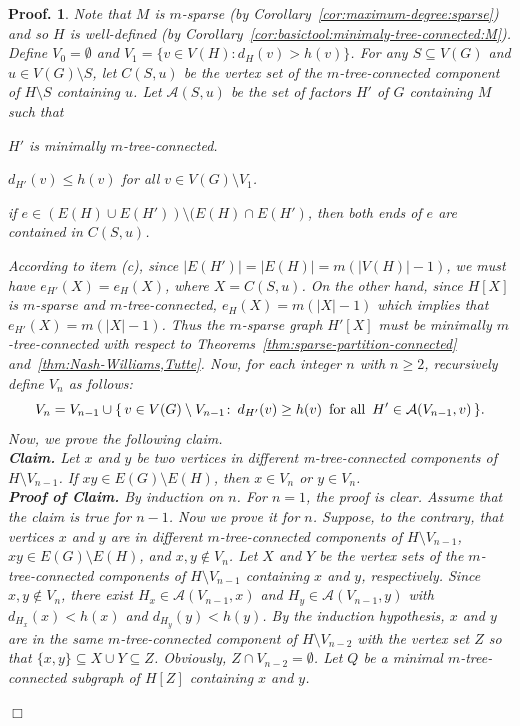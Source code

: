 \documentclass[10pt,bezier]{article}
\newtheorem{preproof}{{\bf Proof.}}
\newenvironment{proof}[1]{\begin{preproof}{\rm
#1}\hfill{$\Box$}}{\end{preproof}}
\begin{document}
\begin{proof}
{Note that $M$ is $m$-sparse (by Corollary~\ref{cor:maximum-degree:sparse}) and so $H$ is well-defined (by Corollary~\ref{cor:basictool:minimaly-tree-connected:M}).
Define $V_0=\emptyset $ and $V_1=\{v\in V(H): d_H(v)> h(v)\}$.
For any $S\subseteq V(G)$ and $u\in V(G)\setminus S$, 
let $C(S,u)$ be the vertex set of the $m$-tree-connected component of $H\setminus S$ containing $u$.
%
Let $\mathcal{A}(S, u)$ be the set of factors $H'$ of $G$ containing $M$ such that
\begin{enumerate}{
\item [(a)] $H'$ is minimally $m$-tree-connected.\label{Condition a}
\item [(b)] $d_{H'}(v)\le h(v)$ for all $v\in V(G)\setminus V_1$.\label{Condition b}
\item [(c)] if $e \in (E (H )\cup E (H')) \setminus (E (H )\cap E (H')$, then both ends of $e$ are contained in $C (S , u )$.\label{Condition c}
}\end{enumerate}
%
According to item (c), since $|E(H')|=|E(H)|=m(|V(H)|-1)$, we must have $e_{H'}(X)=e_H(X)$, where $X=C(S,u)$.
On the other hand, since $H[X]$ is $m$-sparse and $m$-tree-connected, $e_H(X)=m(|X|-1)$ which implies that $e_{H'}(X)=m(|X|-1)$. 
Thus the $m$-sparse graph $H'[X]$ must be minimally $m$-tree-connected with respect to
Theorems~\ref{thm:sparse-partition-connected} and~\ref{thm:Nash-Williams,Tutte}.
Now, for each integer $n$ with $n\ge 2$, recursively define $V_n$ as follows:
$$V_n=V_{n-1} \cup \{\, v\in V(G)\setminus V_{n-1} \colon \, d_{H^\prime }(v)\ge h(v) \text{\, for all\, }H^\prime \in \mathcal{A}(V_{n-1},v)\,\}.$$
 Now, we prove the following claim.
%
\vspace{2mm}\\
{\bf Claim.} 
Let $x$ and $y$ be two vertices in different m-tree-connected components of $H\setminus V_{n-1}$.
If $xy\in E(G)\setminus E(H)$, then $x\in V_{n}$ or $y\in V_{n}$.
\vspace{2mm}\\
{\bf Proof of Claim.} 
By induction on $n$.
%
 For $n=1$, the proof is clear. 
Assume that the claim is true for $n-1$.
Now we prove it for $n$.
%
Suppose, to the contrary, that vertices $x$ and $y$ are in different $m$-tree-connected components of $H\setminus V_{n-1}$,
$xy\in E(G)\setminus E(H)$, 
and $x,y\not \in V_{n}$. 
%
Let $X$ and $Y$ be the vertex sets of the $m$-tree-connected components of $H\setminus V_{n-1}$
containing $x$ and $y$, respectively. 
%
Since $x,y\not\in V_{n}$,
 there exist
 $H_x\in \mathcal{A}(V_{n-1},x)$ and
 $H_y\in \mathcal{A}(V_{n-1},y)$ with $d_{H_x}(x)< h(x)$ and $d_{H_y}(y)< h(y)$. 
%
By the induction hypothesis,
 $x$ and $y$ are in the same $m$-tree-connected component 
of $H\setminus V_{n-2}$ with the vertex set $Z$ so that $\{x,y\}\subseteq X\cup Y \subseteq Z$.
Obviously, $Z\cap V_{n-2}=\emptyset$.
%
Let $Q$ be a minimal $m$-tree-connected subgraph of $H[Z]$ containing $x$ and $y$. 
%

}
\end{proof}
\end{document}
